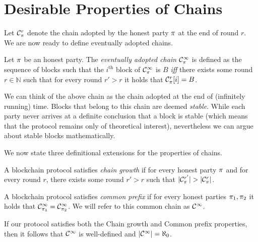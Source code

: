 \section{Desirable Properties of Chains}

Let $\mathcal{C}^r_\pi$ denote the chain adopted by the honest party $\pi$ at
the end of round $r$. We are now ready to define eventually adopted chains.

\begin{definition}
  Let $\pi$ be an honest party. The \emph{eventually adopted chain}
  $\mathcal{C}^\infty_\pi$ is defined as the sequence of blocks such that the
  $i^\text{th}$ block of $\mathcal{C}^\infty_\pi$ is $B$ \emph{iff} there exists
  some round $r \in \mathbb{N}$ such that for every round $r' > r$ it holds that
  $\mathcal{C}^r_\pi[i] = B$.
\end{definition}

We can think of the above chain as the chain adopted at the end of (infinitely
running) time. Blocks that belong to this chain are deemed \emph{stable}. While
each party never arrives at a definite conclusion that a block is stable
(which means that the protocol remains only of theoretical interest),
nevertheless we can argue about stable blocks mathematically.

We now state three definitional extensions for the properties of chains.

\begin{definition}
  A blockchain protocol satisfies \emph{chain growth} if for every honest
  party $\pi$ and for every round $r$, there exists some round $r' > r$ such
  that $|\mathcal{C}^{r'}_\pi| > |\mathcal{C}^r_\pi|$.
\end{definition}

\begin{definition}
  A blockchain protocol satisfies \emph{common prefix} if for every honest
  parties $\pi_1, \pi_2$ it holds that
  $\mathcal{C}^\infty_{\pi_1} = \mathcal{C}^\infty_{\pi_2}$. We will refer to this
  common chain as $\mathcal{C}^\infty$.
\end{definition}

If our protocol satisfies both the Chain growth and Common prefix properties,
then it follows that $\mathcal{C}^\infty$ is well-defined and
$|\mathcal{C}^\infty| = \aleph_0$.


